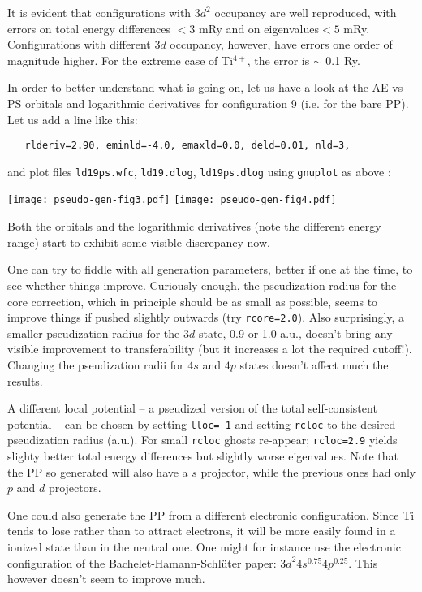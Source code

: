\documentclass[12pt,a4paper]{article}
\begin{document}
It is evident that configurations with $3d^2$ occupancy are well 
reproduced, with errors on total energy differences $<3$ mRy and
on eigenvalues$<5$ mRy. Configurations with different $3d$ occupancy,
however, have errors one order of magnitude higher. For the extreme
case of Ti$^{4+}$, the error is $\sim$ 0.1 Ry.

In order to better understand what is going on, let us have a
look at the AE vs PS orbitals and logarithmic derivatives for
configuration 9 (i.e. for the bare PP). Let us add a line
like this:
\begin{verbatim}
   rlderiv=2.90, eminld=-4.0, emaxld=0.0, deld=0.01, nld=3,
\end{verbatim}
and plot files \texttt{ld19ps.wfc}, \texttt{ld19.dlog},
\texttt{ld19ps.dlog} using \texttt{gnuplot} as above :

\texttt{[image: pseudo-gen-fig3.pdf]}
\texttt{[image: pseudo-gen-fig4.pdf]}

Both the orbitals and the logarithmic derivatives (note the 
different energy range) start to exhibit some visible
discrepancy now.

One can try to fiddle with all generation parameters,
better if one at the time, to see whether things improve.
Curiously enough, the pseudization radius for the core
correction, which in principle should be as small as
possible, seems to improve things if pushed slightly 
outwards (try \texttt{rcore=2.0}). Also surprisingly,
a smaller pseudization radius for the $3d$ state, 0.9 
or 1.0 a.u., doesn't bring any visible improvement 
to transferability
(but it increases a lot the required cutoff!).
Changing the pseudization radii for $4s$ and $4p$ states
doesn't affect much the results. 

A different local potential -- a pseudized version 
of the total self-consistent potential -- can be chosen 
by setting \texttt{lloc=-1} and setting \texttt{rcloc}
to the desired pseudization radius (a.u.). For small 
\texttt{rcloc} ghosts re-appear;  \texttt{rcloc=2.9}
yields slighty better total energy differences but slightly worse
eigenvalues. Note that the PP so generated will also have a 
$s$ projector, while the previous
ones had only $p$ and $d$ projectors. 

One could also generate the PP from a different electronic 
configuration. Since Ti tends to lose rather than to attract
electrons, it will be more easily found in a ionized state than
in the neutral one. One might for instance use the electronic
configuration of the Bachelet-Hamann-Schl\"uter paper\cite{BHS}:
$3d^2 4s^{0.75} 4p^{0.25}$. This however doesn't seem to improve
much. 
\end{document}
